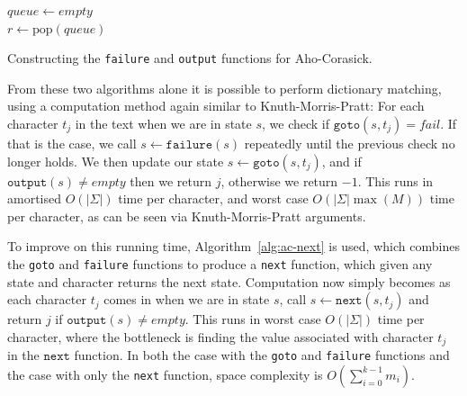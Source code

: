 \documentclass[ %
                    author={Dominic Joseph Moylett},
                    degree={MEng},
                     title={Dictionary Matching with Fingerprints},
                  subtitle={An Empirical Analysis},
                      type={research},
                      year={2015} ]{dissertation}
\begin{document}
\begin{algorithm}[t]
$queue \gets empty$\\
 {
  $r \gets \text{pop}(queue)$\\
}
\caption{Constructing the \texttt{failure} and \texttt{output} functions for Aho-Corasick.}
\label{alg:ac-failure}
\end{algorithm}

From these two algorithms alone it is possible to perform dictionary matching, using a computation method again similar to Knuth-Morris-Pratt: For each character $t_j$ in the text when we are in state $s$, we check if $\texttt{goto}(s, t_j) = fail$. If that is the case, we call $s \gets \texttt{failure}(s)$ repeatedly until the previous check no longer holds. We then update our state $s \gets \texttt{goto}(s, t_j)$, and if $\texttt{output}(s) \neq empty$ then we return $j$, otherwise we return $-1$. This runs in amortised $O(|\Sigma|)$ time per character, and worst case $O(|\Sigma|\max(M))$ time per character, as can be seen via Knuth-Morris-Pratt arguments.

To improve on this running time, Algorithm~\ref{alg:ac-next} is used, which combines the \texttt{goto} and \texttt{failure} functions to produce a \texttt{next} function, which given any state and character returns the next state. Computation now simply becomes as each character $t_j$ comes in when we are in state $s$, call $s \gets \texttt{next}(s, t_j)$ and return $j$ if $\texttt{output}(s) \neq empty$. This runs in worst case $O(|\Sigma|)$ time per character, where the bottleneck is finding the value associated with character $t_j$ in the $\texttt{next}$ function. In both the case with the \texttt{goto} and \texttt{failure} functions and the case with only the \texttt{next} function, space complexity is $O(\sum_{i=0}^{k-1}m_i)$.
\end{document}

